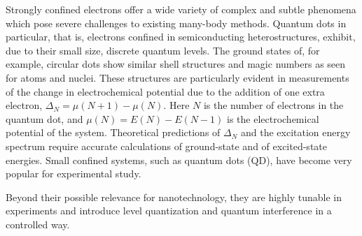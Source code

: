 \documentclass[%
oneside,                 %
final,                   %
10pt]{article}
\begin{document}
Strongly confined electrons offer a wide variety of complex and subtle
phenomena which pose severe challenges to existing many-body methods.
Quantum dots in particular, that is, electrons confined in
semiconducting heterostructures, exhibit, due to their small size,
discrete quantum levels.  The ground states of, for example, circular
dots show similar shell structures and magic numbers as seen for atoms
and nuclei. These structures are particularly evident in measurements
of the change in electrochemical potential due to the addition of one
extra electron, $\Delta_N=\mu(N+1)-\mu(N)$. Here $N$ is the number of
electrons in the quantum dot, and $\mu(N)=E(N)-E(N-1)$ is the
electrochemical potential of the system.  Theoretical predictions of
$\Delta_N$ and the excitation energy spectrum require accurate
calculations of ground-state and of excited-state energies.  Small
confined systems, such as quantum dots (QD), have become very popular
for experimental study. 

Beyond their possible relevance for
nanotechnology, they are highly tunable in experiments and introduce
level quantization and quantum interference in a controlled way. 
\end{document}
